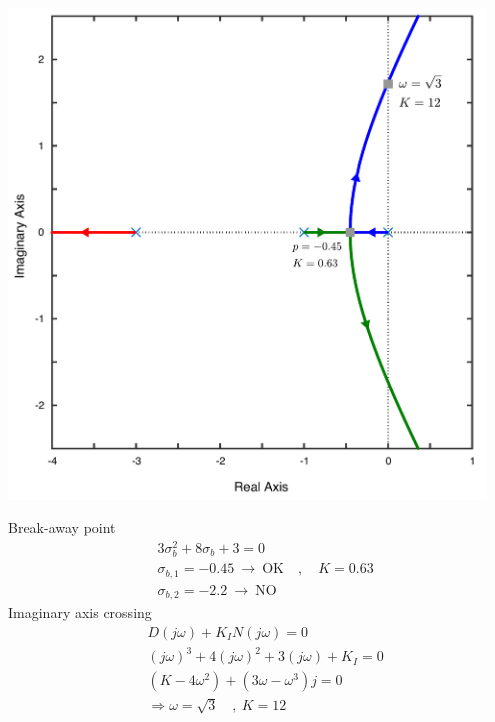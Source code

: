\documentclass[twoside]{article}
\begin{document}
\begin{minipage}[h]{0.5\linewidth}
    \begin{center}
      \includegraphics[width=0.95\textwidth]{Ilocus}
    \end{center}
\end{minipage}
\begin{minipage}[h]{0.5\linewidth}
	Break-away point
	\begin{align*}
	& 3 \sigma_{b}^2 + 8 \sigma_b + 3 = 0 
	\\
	& \sigma_{b,1} = - 0.45  \ \rightarrow \ \mathrm{OK} \quad ,
          \quad K = 0.63
	\\
	& \sigma_{b,2} =  -2.2 \ \rightarrow \ \mathrm{NO}
	\end{align*}
	Imaginary axis crossing
	\begin{align*}
	& D(j \omega) + K_I N(j \omega) = 0 \\ 	 
	& (j \omega)^3 + 4 (j \omega)^2 + 3 (j \omega) + K_I = 0 \\ 
	& (K - 4 \omega^2) + (3 \omega - \omega^3) j = 0
	\\ & \Rightarrow \omega = \sqrt{3}  \quad , \ K = 12
	\end{align*}
\end{minipage}

\vspace{12pt}
\end{document}
